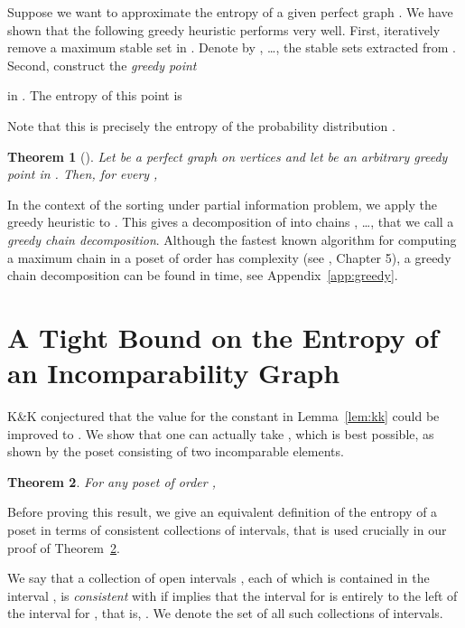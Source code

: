 \documentclass{article} \usepackage{fullpage}
\newtheorem{theorem}{Theorem}
\begin{document}
Suppose we want to approximate the entropy  of a given perfect graph . 
We have shown \cite{POP_SICOMP} that the following greedy heuristic performs very well. First, iteratively remove a maximum stable set in . Denote by , \ldots,  the stable sets extracted from . Second, construct the {\sl greedy point\/}
 
in . The entropy of this point is

Note that this is precisely the entropy of the probability distribution .

\begin{theorem}[\cite{POP_SICOMP}]
\label{thm:greedy}
Let  be a perfect graph on  vertices and let  be an arbitrary greedy point in . 
Then, for every ,

\end{theorem}

In the context of the sorting under partial information problem, we apply the greedy heuristic to . This gives a decomposition of  into chains , \ldots,  that we call a {\sl greedy chain decomposition}. Although the fastest known algorithm for computing a maximum chain in a poset of order  has complexity  (see \cite{Gbook}, Chapter 5), a greedy chain decomposition can be found in  time, see Appendix~\ref{app:greedy}.

\section{A Tight Bound on the Entropy of an Incomparability Graph}
\label{sec:tight_bound}

K\&K conjectured that the value for the constant  in Lemma~\ref{lem:kk} could be improved to . We show that one can actually take , which is best possible, as shown by the poset consisting of two incomparable elements.

\begin{theorem}
\label{th:c1}
For any poset  of order ,

\end{theorem}

Before proving this result, we give an equivalent definition of the entropy of a poset in terms of consistent collections of intervals, that is used crucially in our proof of Theorem~\ref{th:c1}.

We say that a collection of open intervals , each of which is contained in the interval , is {\sl consistent\/} with  if  implies that the interval for  is entirely to the left of the interval for , that is, . We denote  the set of all such collections of intervals.
\end{document}
